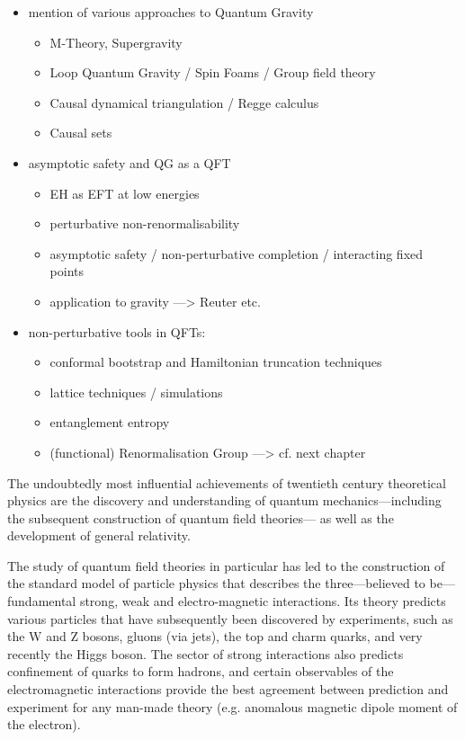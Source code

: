 \documentclass[11pt]{book} %
\numberwithin{equation}{chapter}
\begin{document}
\begin{itemize}
  \item mention of various approaches to Quantum Gravity
    \begin{itemize}
      \item M-Theory, Supergravity
      \item Loop Quantum Gravity / Spin Foams / Group field theory
      \item Causal dynamical triangulation / Regge calculus
      \item Causal sets
    \end{itemize}
  \item asymptotic safety and QG as a QFT
    \begin{itemize}
      \item EH as EFT at low energies
      \item perturbative non-renormalisability
      \item asymptotic safety / non-perturbative completion / interacting fixed points
      \item application to gravity ---> Reuter etc.
    \end{itemize}
  \item non-perturbative tools in QFTs:
    \begin{itemize}
      \item conformal bootstrap and Hamiltonian truncation techniques
      \item lattice techniques / simulations
      \item entanglement entropy
      \item (functional) Renormalisation Group ---> cf. next chapter
    \end{itemize}
\end{itemize}

The undoubtedly most influential achievements of twentieth century theoretical physics
are the discovery and understanding of
quantum mechanics---including the subsequent construction of quantum field theories---%
as well as the development of general relativity.

The study of quantum field theories in particular has led to the construction
of the standard model of particle physics that describes the three---believed to be---fundamental
strong, weak and electro-magnetic interactions.
Its theory predicts various particles
that have subsequently been discovered by experiments,
such as the W and Z bosons, gluons (via jets), the top and charm quarks, and very recently the Higgs boson.
The sector of strong interactions also predicts confinement of quarks to form hadrons, and
certain observables of the electromagnetic interactions provide the best agreement between
prediction and experiment for any man-made theory (e.g. anomalous magnetic dipole moment of the electron).
\end{document}
